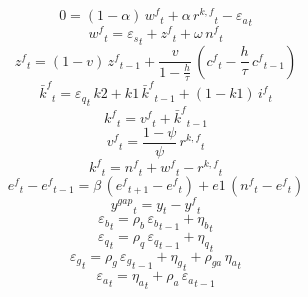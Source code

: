 \begin{dmath}
0=\left(1-{{\alpha}}\right)\, {{w^{f}}}_{t}+{{\alpha}}\, {{r^{k,f}}}_{t}-{{\varepsilon_a}}_{t}
\end{dmath}
\begin{dmath}
{{w^{f}}}_{t}={{\varepsilon_s}}_{t}+{{z^{f}}}_{t}+{{\omega}}\, {{n^{f}}}_{t}
\end{dmath}
\begin{dmath}
{{z^{f}}}_{t}=\left(1-{{v}}\right)\, {{z^{f}}}_{t-1}+\frac{{{v}}}{1-\frac{{{h}}}{{{\tau}}}}\, \left({{c^{f}}}_{t}-\frac{{{h}}}{{{\tau}}}\, {{c^{f}}}_{t-1}\right)
\end{dmath}
\begin{dmath}
{{\bar{k}^{f}}}_{t}={{\varepsilon_q}}_{t}\, {k2}+{k1}\, {{\bar{k}^{f}}}_{t-1}+\left(1-{k1}\right)\, {{i^{f}}}_{t}
\end{dmath}
\begin{dmath}
{{k^{f}}}_{t}={{v^{f}}}_{t}+{{\bar{k}^{f}}}_{t-1}
\end{dmath}
\begin{dmath}
{{v^{f}}}_{t}=\frac{1-{{\psi}}}{{{\psi}}}\, {{r^{k,f}}}_{t}
\end{dmath}
\begin{dmath}
{{k^{f}}}_{t}={{n^{f}}}_{t}+{{w^{f}}}_{t}-{{r^{k,f}}}_{t}
\end{dmath}
\begin{dmath}
{{e^{f}}}_{t}-{{e^{f}}}_{t-1}={{\beta}}\, \left({{e^{f}}}_{t+1}-{{e^{f}}}_{t}\right)+{e1}\, \left({{n^{f}}}_{t}-{{e^{f}}}_{t}\right)
\end{dmath}
\begin{dmath}
{{y^{gap}}}_{t}={{y}}_{t}-{{y^{f}}}_{t}
\end{dmath}
\begin{dmath}
{{\varepsilon_b}}_{t}={{\rho_b}}\, {{\varepsilon_b}}_{t-1}+{{\eta_b}}_{t}
\end{dmath}
\begin{dmath}
{{\varepsilon_q}}_{t}={{\rho_q}}\, {{\varepsilon_q}}_{t-1}+{{\eta_q}}_{t}
\end{dmath}
\begin{dmath}
{{\varepsilon_g}}_{t}={{\rho_g}}\, {{\varepsilon_g}}_{t-1}+{{\eta_g}}_{t}+{{\rho_{ga}}}\, {{\eta_a}}_{t}
\end{dmath}
\begin{dmath}
{{\varepsilon_a}}_{t}={{\eta_a}}_{t}+{{\rho_a}}\, {{\varepsilon_a}}_{t-1}
\end{dmath}
